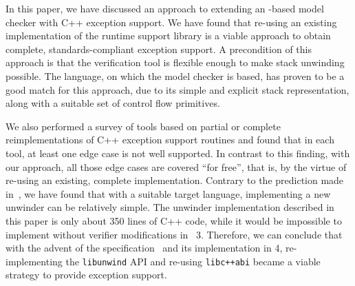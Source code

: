 In this paper, we have discussed an approach to extending an \llvm{}-based
model checker with C++ exception support. We have found that re-using an
existing implementation of the runtime support library is a viable
approach to obtain complete, standards-compliant exception support. A
precondition of this approach is that the verification tool is flexible
enough to make stack unwinding possible. The \divm{} language, on which the
\divine{} model checker is based, has proven to be a good match for this
approach, due to its simple and explicit stack representation, along
with a suitable set of control flow primitives.

We also performed a survey of tools based on partial or complete
reimplementations of C++ exception support routines and found that in
each tool, at least one edge case is not well supported. In contrast to
this finding, with our approach, all those edge cases are covered ``for
free'', that is, by the virtue of re-using an existing, complete
implementation. Contrary to the prediction made
in~\cite{rockai16:model.checkin}, we have found that with a suitable
target language, implementing a new unwinder can be relatively simple.
The unwinder implementation described in this paper is only about 350
lines of C++ code, while it would be impossible to implement without
verifier modifications in \divine{}~3. Therefore, we can conclude that with
the advent of the \divm{} specification~\cite{rockai17:divm} and its
implementation in \divine{} 4, re-implementing the \texttt{libunwind} API
and re-using \texttt{libc++abi} became a viable strategy to provide
exception support.

